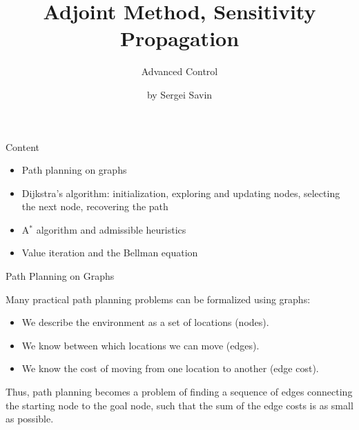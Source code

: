 \documentclass{beamer}
\subtitle{Advanced Control}
\author{by Sergei Savin}
\date{\mydate}
\title{Adjoint Method, Sensitivity Propagation}
\begin{document}
\maketitle


\begin{frame}{Content}
	\begin{itemize}
		\item Path planning on graphs
		\item Dijkstra's algorithm: initialization, exploring and updating nodes, selecting the next node, recovering the path
		\item A$^\ast$ algorithm and admissible heuristics
		\item Value iteration and the Bellman equation
	\end{itemize}
\end{frame}


\begin{frame}{Path Planning on Graphs}
	\begin{flushleft}
		
		Many practical path planning problems can be
		formalized using graphs:
		
		\begin{itemize}
			\item We describe the environment as a set of
			locations (nodes).
			\item We know between which locations we can
			move (edges).
			\item We know the cost of moving from one
			location to another (edge cost).
		\end{itemize}
		
		Thus, path planning becomes a problem of finding
		a sequence of edges connecting the starting node
		to the goal node, such that the sum of the edge
		costs is as small as possible.
		
	\end{flushleft}
\end{frame}
\end{document}

